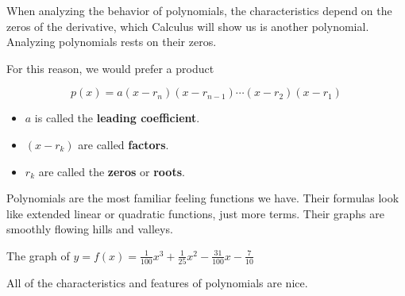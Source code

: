 \documentclass{ximera}
\begin{document}
When analyzing the behavior of polynomials, the characteristics depend on the zeros of the derivative, which Calculus will show us is another polynomial.  Analyzing polynomials rests on their zeros.


For this reason, we would prefer a product

\[   p(x) = a (x-r_n)(x-r_{n-1})  \cdots (x-r_2)(x-r_1)  \]


\begin{itemize}

\item $a$ is called the \textbf{leading coefficient}.
\item $(x-r_k)$ are called \textbf{factors}.
\item $r_k$ are called the \textbf{zeros} or \textbf{roots}.

\end{itemize}






Polynomials are the most familiar feeling functions we have. Their formulas look like extended linear or quadratic functions, just more terms. Their graphs are smoothly flowing hills and valleys.

The graph of $y = f(x) = \frac{1}{100} x^3 + \frac{1}{25} x^2 - \frac{31}{100} x - \frac{7}{10}$

\begin{image}
\end{image}



All of the characteristics and features of polynomials are nice.
\end{document}
